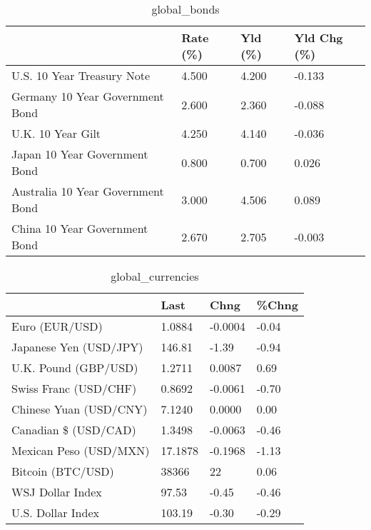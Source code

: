 \documentclass{article}%
\begin{document}
%


\begin{table}[htbp]%
\caption{global\_bonds}%
\centering%
\begin{adjustbox}{width=1\textwidth}%
\begin{tabular}{llll}
\toprule
                                  & Rate (\%) & Yld (\%) & Yld Chg (\%) \\
\midrule
       U.S. 10 Year Treasury Note &    4.500 &   4.200 &      -0.133 \\
  Germany 10 Year Government Bond &    2.600 &   2.360 &      -0.088 \\
                U.K. 10 Year Gilt &    4.250 &   4.140 &      -0.036 \\
    Japan 10 Year Government Bond &    0.800 &   0.700 &       0.026 \\
Australia 10 Year Government Bond &    3.000 &   4.506 &       0.089 \\
    China 10 Year Government Bond &    2.670 &   2.705 &      -0.003 \\
\bottomrule
\end{tabular}
%
\end{adjustbox}%
\end{table}

%


\begin{table}[htbp]%
\caption{global\_currencies}%
\centering%
\begin{adjustbox}{width=1\textwidth}%
\begin{tabular}{llll}
\toprule
                       &    Last &    Chng & \%Chng \\
\midrule
        Euro (EUR/USD) &  1.0884 & -0.0004 & -0.04 \\
Japanese Yen (USD/JPY) &  146.81 &   -1.39 & -0.94 \\
  U.K. Pound (GBP/USD) &  1.2711 &  0.0087 &  0.69 \\
 Swiss Franc (USD/CHF) &  0.8692 & -0.0061 & -0.70 \\
Chinese Yuan (USD/CNY) &  7.1240 &  0.0000 &  0.00 \\
  Canadian \$ (USD/CAD) &  1.3498 & -0.0063 & -0.46 \\
Mexican Peso (USD/MXN) & 17.1878 & -0.1968 & -1.13 \\
     Bitcoin (BTC/USD) &   38366 &      22 &  0.06 \\
      WSJ Dollar Index &   97.53 &   -0.45 & -0.46 \\
     U.S. Dollar Index &  103.19 &   -0.30 & -0.29 \\
\bottomrule
\end{tabular}
%
\end{adjustbox}%
\end{table}
\end{document}
